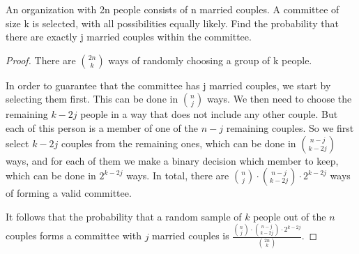 \begin{exercise}{37}
An organization with 2n people consists of n married couples. A committee of size k is selected, with all possibilities equally likely. Find the probability that there are exactly j married couples within the committee.
\end{exercise}

\begin{proof}
    There are ${2n \choose k}$ ways of randomly choosing a group of k people.

    In order to guarantee that the committee has j married couples, we start by selecting them first. This can be done in ${n \choose j}$ ways. We then need to choose the remaining $k-2j$ people in a way that does not include any other couple. But each of this person is a member of one of the $n-j$ remaining couples. So we first select $k-2j$ couples from the remaining ones, which can be done in ${{n-j} \choose {k-2j}}$ ways, and for each of them we make a binary decision which member to keep, which can be done in $2^{k-2j}$ ways. In total, there are ${n \choose j} \cdot {{n-j} \choose {k-2j}} \cdot 2^{k-2j}$ ways of forming a valid committee.

    It follows that the probability that a random sample of $k$ people out of the $n$ couples forms a committee with $j$ married couples is $\frac{{n \choose j} \cdot {{n-j} \choose {k-2j}} \cdot 2^{k-2j}}{{2n \choose k}}$.
    

\end{proof}




